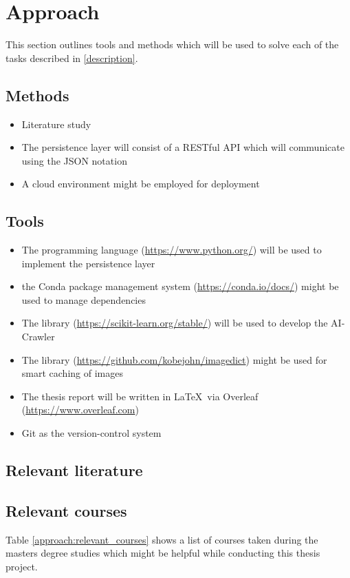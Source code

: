 \section{Approach}

This section outlines tools and methods which will be used to solve each of the tasks described in \ref{description}.

\subsection{Methods}
\begin{itemize}
    \item Literature study
    \item The persistence layer will consist of a RESTful API which will communicate using the JSON notation
    \item A cloud environment might be employed for deployment
\end{itemize}

\subsection{Tools}
 
\begin{itemize}
    \item The \Python programming language (\url{https://www.python.org/}) will be used to implement the persistence layer
    \item the Conda package management system (\url{https://conda.io/docs/}) might be used to manage \Python dependencies
    \item The \Python library \scikit (\url{https://scikit-learn.org/stable/}) will be used to develop the AI-Crawler
    \item The \Python library \ImageDict (\url{https://github.com/kobejohn/imagedict}) might be used for smart caching of images
    \item The thesis report will be written in \LaTeX ~via Overleaf (\url{https://www.overleaf.com})
    \item Git as the version-control system
\end{itemize}

\subsection{Relevant literature}


\subsection{Relevant courses}
Table \ref{approach:relevant_courses} shows a list of courses taken during the masters degree studies which might be helpful while conducting this thesis project.

